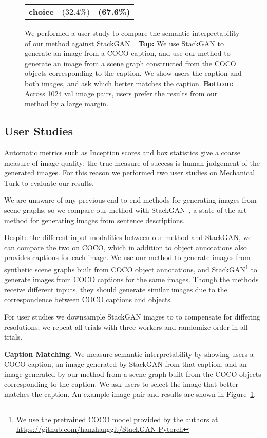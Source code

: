 \documentclass[10pt,twocolumn,letterpaper]{article}
\begin{document}
\begin{figure}
\begin{tabular}{c|c|c}
    \textbf{choice}  & (32.4\%) & \textbf{(67.6\%)}
  \end{tabular}
  \vspace{1mm}
  \caption{
    We performed a user study to compare the semantic interpretability of our method against
    StackGAN~\cite{zhang2017stackgan}. \textbf{Top:} We use StackGAN to generate an image from a
    COCO caption, and use our method to generate an image from a scene graph constructed from the
    COCO objects corresponding to the caption. We show users the caption and both images,
    and ask which better matches the caption. \textbf{Bottom:} Across 1024 val image pairs, users prefer the
    results from our method by a large margin.
  }
  \vspace{-4mm}
  \label{fig:caption-study}
\end{figure}
 
\subsection{User Studies}
\label{sec:user-study}
Automatic metrics such as Inception scores and box statistics give a
coarse measure of image quality; the true measure of success is
human judgement of the generated images. For this reason we performed two user
studies on Mechanical Turk to evaluate our results.

We are unaware of any previous end-to-end methods for generating images from
scene graphs, so we compare our method with StackGAN~\cite{zhang2017stackgan},
a state-of-the art method for generating images from sentence descriptions.

Despite the different input modalities between our method and StackGAN, we can
compare the two on COCO, which in addition to object annotations also provides
captions for each image.
We use our method to generate images from synthetic scene
graphs built from COCO object annotations, and StackGAN\footnote{We use the pretrained COCO model provided by the authors at \url{https://github.com/hanzhanggit/StackGAN-Pytorch}} to generate images from COCO captions for the same images.
Though the methods receive different inputs, they should generate similar images due to the correspondence between COCO captions and objects.

For user studies we downsample StackGAN images to  to compensate for differing resolutions; we repeat all trials with three workers and randomize order in all trials.

\textbf{Caption Matching.}
We measure semantic interpretability by showing users a COCO caption, an image generated by StackGAN from that caption, and an image generated by our method from a scene graph built from the COCO objects corresponding to the caption. We ask users to select the image that better matches the caption. An example image pair and results are shown in Figure~\ref{fig:caption-study}.
\end{document}
